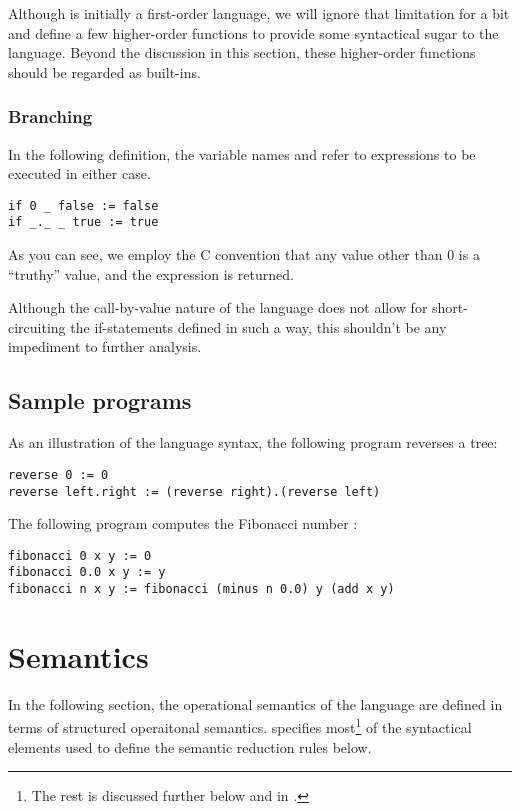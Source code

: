 Although  is initially a first-order language, we will ignore that
limitation for a bit and define a few higher-order functions to provide some
syntactical sugar to the language. Beyond the discussion in this section, these
higher-order functions should be regarded as  built-ins.

\subsubsection{Branching}

In the following definition, the variable names  and 
refer to expressions to be executed in either case.

\begin{verbatim}
if 0 _ false := false
if _._ _ true := true
\end{verbatim}

As you can see, we employ the C convention that any value other than $0$ is a
``truthy'' value, and the expression  is returned.

Although the call-by-value nature of the language does not allow for
short-circuiting the if-statements defined in such a way, this shouldn't be any
impediment to further analysis.

\subsection{Sample programs}

As an illustration of the language syntax, the following program reverses a tree:

\begin{verbatim}
reverse 0 := 0
reverse left.right := (reverse right).(reverse left)
\end{verbatim}

The following program computes the Fibonacci number :

\begin{verbatim}
fibonacci 0 x y := 0
fibonacci 0.0 x y := y
fibonacci n x y := fibonacci (minus n 0.0) y (add x y)
\end{verbatim}

\section{Semantics}

In the following section, the operational semantics of the language 
are defined in terms of structured operaitonal semantics\cite{sos}.
 specifies most\footnote{The rest is discussed
further below and in .} of the
syntactical elements used to define the semantic reduction rules below.

